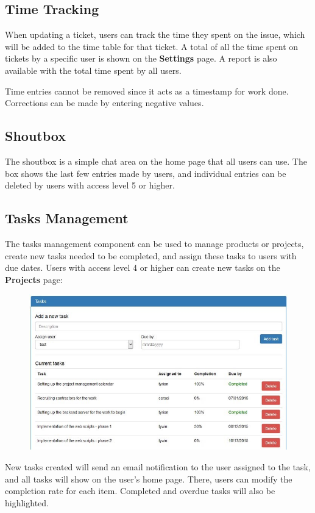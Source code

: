 \documentclass[11pt]{article}
\begin{document}
\subsection{Time Tracking}
When updating a ticket, users can track the time they spent on the issue, which will be added to the time table for that ticket. A total of all the time spent on tickets by a specific user is shown on the \textbf{Settings} page. A report is also available with the total time spent by all users.

Time entries cannot be removed since it acts as a timestamp for work done. Corrections can be made by entering negative values.

\subsection{Shoutbox}
The shoutbox is a simple chat area on the home page that all users can use. The box shows the last few entries made by users, and individual entries can be deleted by users with access level 5 or higher.

\subsection{Tasks Management}
The tasks management component can be used to manage products or projects, create new tasks needed to be completed, and assign these tasks to users with due dates. Users with access level 4 or higher can create new tasks on the \textbf{Projects} page:

\begin{figure}[h]
\includegraphics{projectmanagement.jpg}
\end{figure}

New tasks created will send an email notification to the user assigned to the task, and all tasks will show on the user's home page. There, users can modify the completion rate for each item. Completed and overdue tasks will also be highlighted.
\end{document}
